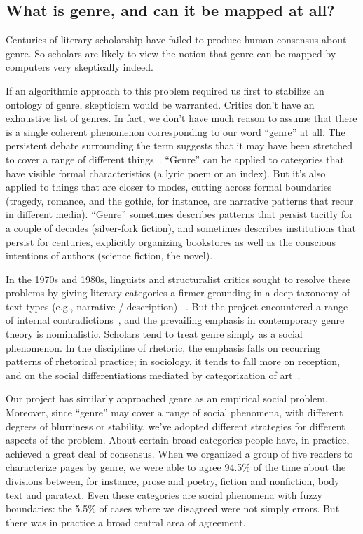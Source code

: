 \documentclass[paper=a4, fontsize=12pt]{scrartcl}
\numberwithin{equation}{section}		%
\numberwithin{figure}{section}			%
\numberwithin{table}{section}				%
\begin{document}
\subsection{What is genre, and can it be mapped at all?}
Centuries of literary scholarship have failed to produce human consensus about genre. So scholars are likely to view the notion that genre can be mapped by computers very skeptically indeed.

If an algorithmic approach to this problem required us first to stabilize an ontology of genre, skepticism would be warranted. Critics don't have an exhaustive list of genres. In fact, we don't have much reason to assume that there is a single coherent phenomenon corresponding to our word ``genre'' at all. The persistent debate surrounding the term suggests that it may have been stretched to cover a range of different things~\cite{santini:genre}. ``Genre'' can be applied to categories that have visible formal characteristics (a lyric poem or an index). But it's also applied to things that are closer to modes, cutting across formal boundaries (tragedy, romance, and the gothic, for instance, are narrative patterns that recur in different media). ``Genre'' sometimes describes patterns that persist tacitly for a couple of decades (silver-fork fiction), and sometimes describes institutions that persist for centuries, explicitly organizing bookstores as well as the conscious intentions of authors (science fiction, the novel).

In the 1970s and 1980s, linguists and structuralist critics sought to resolve these problems by giving literary categories a firmer grounding in a deep taxonomy of text types (e.g., narrative / description) ~\cite{genette:genre, biber:typology}. But the project encountered a range of internal contradictions~\cite{derrida:genre}, and the prevailing emphasis in contemporary genre theory is nominalistic. Scholars tend to treat genre simply as a social phenomenon. In the discipline of rhetoric, the emphasis falls on recurring patterns of rhetorical practice; in sociology, it tends to fall more on reception, and on the social differentiations mediated by categorization of art~\cite{devitt:genre, dimaggio:classification}.

Our project has similarly approached genre as an empirical social problem. Moreover, since ``genre'' may cover a range of social phenomena, with different degrees of blurriness or stability, we've adopted different strategies for different aspects of the problem. About certain broad categories people have, in practice, achieved a great deal of consensus. When we organized a group of five readers to characterize pages by genre, we were able to agree 94.5\% of the time about the divisions between, for instance, prose and poetry, fiction and nonfiction, body text and paratext. Even these categories are social phenomena with fuzzy boundaries: the 5.5\% of cases where we disagreed were not simply errors. But there was in practice a broad central area of agreement.
\end{document}
